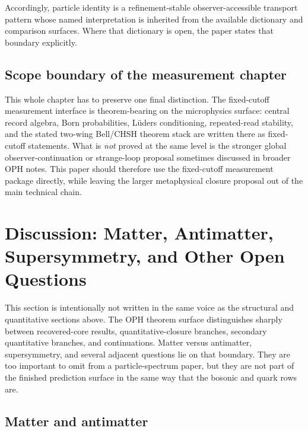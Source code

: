\documentclass[11pt]{article}
\begin{document}
Accordingly, particle identity is a refinement-stable
observer-accessible transport pattern whose named interpretation is inherited from the
available dictionary and comparison surfaces. Where that dictionary is open, the paper states
that boundary explicitly.

\subsection{Scope boundary of the measurement chapter}

This whole chapter has to preserve one final distinction. The fixed-cutoff measurement interface
is theorem-bearing on the microphysics surface: central record algebra, Born
probabilities, L\"uders conditioning, repeated-read stability, and the stated two-wing
Bell/CHSH theorem stack are written there as fixed-cutoff statements. What is \emph{not} proved
at the same level is the stronger global observer-continuation or strange-loop proposal sometimes
discussed in broader OPH notes. This paper should therefore use the fixed-cutoff measurement
package directly, while leaving the larger metaphysical closure proposal out of the main technical
chain.

\section{Discussion: Matter, Antimatter, Supersymmetry, and Other Open Questions}

This section is intentionally not written in the same voice as the structural and quantitative
sections above. The OPH theorem surface distinguishes sharply between recovered-core
results, quantitative-closure branches, secondary quantitative branches, and continuations. Matter versus
antimatter, supersymmetry, and several adjacent questions lie on that boundary. They are too
important to omit from a particle-spectrum paper, but they are not part of the finished
prediction surface in the same way that the bosonic and quark rows are.

\subsection{Matter and antimatter}
\end{document}
